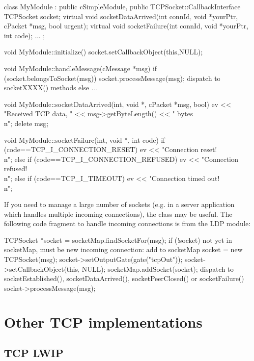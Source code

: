 \begin{cpp}
class MyModule : public cSimpleModule, public TCPSocket::CallbackInterface
{
    TCPSocket socket;
    virtual void socketDataArrived(int connId, void *yourPtr,
                                   cPacket *msg, bool urgent);
    virtual void socketFailure(int connId, void *yourPtr, int code);
    ...
};

void MyModule::initialize() {
    socket.setCallbackObject(this,NULL);
}

void MyModule::handleMessage(cMessage *msg) {
    if (socket.belongsToSocket(msg))
        socket.processMessage(msg); dispatch to socketXXXX() methods
    else
        ...
}

void MyModule::socketDataArrived(int, void *, cPacket *msg, bool) {
    ev << "Received TCP data, " << msg->getByteLength() << " bytes\\n";
    delete msg;
}

void MyModule::socketFailure(int, void *, int code) {
    if (code==TCP_I_CONNECTION_RESET)
        ev << "Connection reset!\\n";
    else if (code==TCP_I_CONNECTION_REFUSED)
        ev << "Connection refused!\\n";
    else if (code==TCP_I_TIMEOUT)
        ev << "Connection timed out!\\n";
}
\end{cpp}

If you need to manage a large number of sockets (e.g. in a server
application which handles multiple incoming connections), the
 class may be useful. The following code
fragment to handle incoming connections is from the LDP module:

\begin{cpp}
TCPSocket *socket = socketMap.findSocketFor(msg);
if (!socket)
{
    not yet in socketMap, must be new incoming connection: add to socketMap
    socket = new TCPSocket(msg);
    socket->setOutputGate(gate("tcpOut"));
    socket->setCallbackObject(this, NULL);
    socketMap.addSocket(socket);
}
dispatch to socketEstablished(), socketDataArrived(), socketPeerClosed()
or socketFailure()
socket->processMessage(msg);
\end{cpp}

\section{Other TCP implementations}
\label{sec:other_tcp}

\subsection{TCP LWIP}

